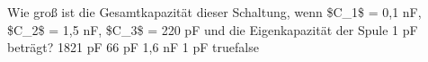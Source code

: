     {Wie groß ist die Gesamtkapazität dieser Schaltung, wenn \$C\_1\$ = 0,1 nF, \$C\_2\$ = 1,5 nF, \$C\_3\$ = 220 pF und die Eigenkapazität der Spule 1 pF beträgt?}
    {1821 pF}
    {66 pF}
    {1,6 nF}
    {1 pF}
    {true}{false}